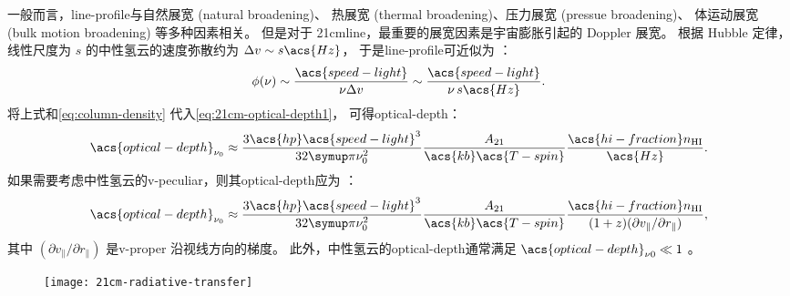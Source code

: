 一般而言，\ac{line-profile}与自然展宽 (natural broadening)、
热展宽 (thermal broadening)、压力展宽 (pressue broadening)、
体运动展宽 (bulk motion broadening) 等多种因素相关。
但是对于 \ac{21cmline}，最重要的展宽因素是宇宙膨胀引起的 Doppler 展宽。
根据 Hubble 定律，线性尺度为 $s$ 的中性氢云的速度弥散约为
$\Delta v \sim s \acs{Hz}$，
于是\ac{line-profile}可近似为 \cite{furlanetto2006,morales2010}：
\begin{equation}
  \phi(\nu) \sim \frac{\acs{speed-light}}{\nu \Delta v}
    \sim \frac{\acs{speed-light}}{\nu \, s \acs{Hz}} .
\end{equation}
将上式和\autoref{eq:column-density} 代入\autoref{eq:21cm-optical-depth1}，
可得\acl{optical-depth}：
\begin{equation}
  \label{eq:21cm-optical-depth2}
  \acs{optical-depth}_{\nu_0}
    \approx \frac{3 \acs{hp} \acs{speed-light}^3}{32\Cpi \nu_0^2}
      \frac{A_{21}}{\acs{kb} \acs{T-spin}}
      \frac{\acs{hi-fraction} n_{\R{HI}}}{\acs{Hz}} .
\end{equation}
如果需要考虑中性氢云的\ac{v-peculiar}，则其\acl{optical-depth}应为
\cite{bharadwaj2005,furlanetto2006,pritchard2012}：
\begin{equation}
  \label{eq:21cm-optical-depth3}
  \acs{optical-depth}_{\nu_0}
    \approx \frac{3 \acs{hp} \acs{speed-light}^3}{32\Cpi \nu_0^2}
      \frac{A_{21}}{\acs{kb} \acs{T-spin}}
      \frac{\acs{hi-fraction} n_{\R{HI}}}{
        (1+z) (\partial v_{\parallel} / \partial r_{\parallel})} ,
\end{equation}
其中 $(\partial v_{\parallel} / \partial r_{\parallel})$ 是\ac{v-proper}
沿视线方向的梯度。
此外，中性氢云的\acl{optical-depth}通常满足
$\acs{optical-depth}_{\nu0} \ll 1$
\cite{madau1997,furlanetto2006,pritchard2010mn}。

\begin{figure}[htp]
  \centering
  \texttt{[image: 21cm-radiative-transfer]}
  \label{fig:21cm-cmb-rt}
\end{figure}

